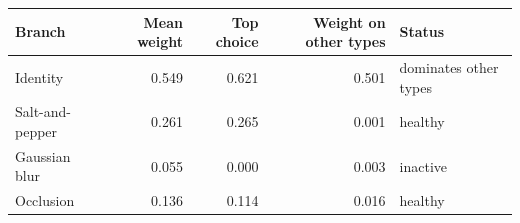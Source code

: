 \begin{tabular}{lrrrl}
\toprule
Branch & Mean weight & Top choice & Weight on other types & Status \\
\midrule
Identity & 0.549 & 0.621 & 0.501 & dominates other types \\
Salt-and-pepper & 0.261 & 0.265 & 0.001 & healthy \\
Gaussian blur & 0.055 & 0.000 & 0.003 & inactive \\
Occlusion & 0.136 & 0.114 & 0.016 & healthy \\
\bottomrule
\end{tabular}
